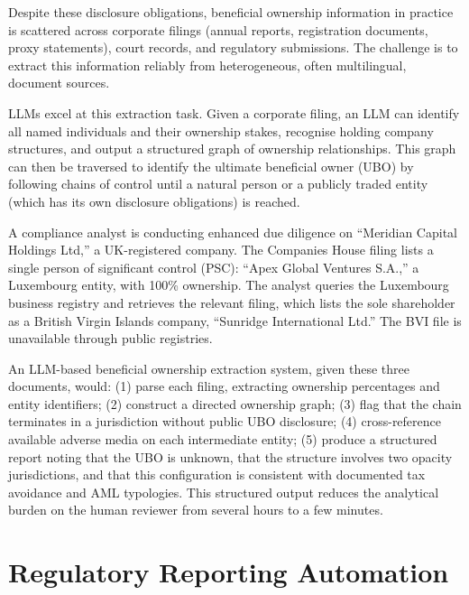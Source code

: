 Despite these disclosure obligations, beneficial ownership information in practice is scattered across corporate filings (annual reports, registration documents, proxy statements), court records, and regulatory submissions. The challenge is to extract this information reliably from heterogeneous, often multilingual, document sources.

LLMs excel at this extraction task. Given a corporate filing, an LLM can identify all named individuals and their ownership stakes, recognise holding company structures, and output a structured graph of ownership relationships. This graph can then be traversed to identify the ultimate beneficial owner (UBO) by following chains of control until a natural person or a publicly traded entity (which has its own disclosure obligations) is reached.

\begin{example}
\label{ex:bo-extraction}
A compliance analyst is conducting enhanced due diligence on ``Meridian Capital Holdings Ltd,'' a UK-registered company. The Companies House filing lists a single person of significant control (PSC): ``Apex Global Ventures S.A.,'' a Luxembourg entity, with 100\% ownership. The analyst queries the Luxembourg business registry and retrieves the relevant filing, which lists the sole shareholder as a British Virgin Islands company, ``Sunridge International Ltd.'' The BVI file is unavailable through public registries.

An LLM-based beneficial ownership extraction system, given these three documents, would: (1) parse each filing, extracting ownership percentages and entity identifiers; (2) construct a directed ownership graph; (3) flag that the chain terminates in a jurisdiction without public UBO disclosure; (4) cross-reference available adverse media on each intermediate entity; (5) produce a structured report noting that the UBO is unknown, that the structure involves two opacity jurisdictions, and that this configuration is consistent with documented tax avoidance and AML typologies. This structured output reduces the analytical burden on the human reviewer from several hours to a few minutes.
\end{example}

\section{Regulatory Reporting Automation}
\label{sec:ch11-regulatory-reporting}

